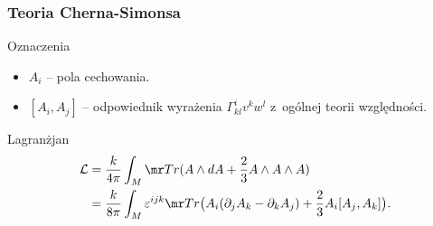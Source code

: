 \documentclass[10pt,t]{beamer}
\begin{document}
\begin{frame}
  \frametitle{Teoria Cherna-Simonsa}


  Oznaczenia
  \begin{itemize}

  \item $A_{ i }$ -- pola cechowania.

  \item $[ A_{ i }, A_{ j } ]$ -- odpowiednik wyrażenia
    $\Gamma^{ i }_{ k l } v^{ k } w^{ l }$ z~ogólnej teorii
    względności.

  \end{itemize}


  Lagranżjan
  \begin{equation}
    \label{eq:Ogolna-wspolzmienniczosc-03}
    \begin{split}
      \Lcal
      &= \frac{ k }{ 4 \pi } \int_{ M } \Tr ( A \wedge dA
        + \frac{ 2 }{ 3 } A \wedge A \wedge A ) \\
      &= \frac{ k }{ 8 \pi } \int_{ M } \varepsilon^{ i j k } \Tr \big( A_{ i } ( \partial_{ j } A_{ k }
        - \partial_{ k } A_{ j } ) + \frac{ 2 }{ 3 } A_{ i } [ A_{ j }, A_{ k } ] \big).
      \end{split}
    \end{equation}

\end{frame}




















\begin{frame}


  

  {}

\end{frame}











\end{document}
